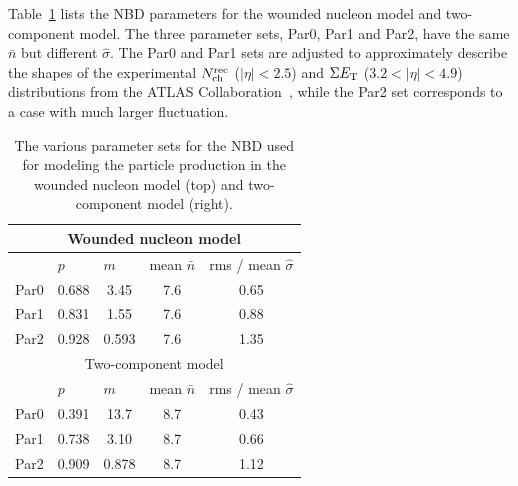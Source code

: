 Table~\ref{table:centfluc_Glauber_pars} lists the NBD parameters for the wounded nucleon model and two-component model. The three parameter sets, Par0, Par1 and Par2, have the same $\bar{n}$ but different $\hat{\sigma}$. The Par0 and Par1 sets are adjusted to approximately describe the shapes of the experimental $N_\text{ch}^\text{rec}$ ($|\eta|<2.5$) and $\Sigma E_\text{T}$ ($3.2<|\eta|<4.9$) distributions from the ATLAS Collaboration~\cite{ATLAS-CONF-2017-066}, while the Par2 set corresponds to a case with much larger fluctuation.

\begin{table}[H]
\centering
\begin{tabular}{|lcccc|}
\hline
\multicolumn{5}{|c|}{Wounded nucleon model}                                                                                                                                \\ \hline
                           & \multicolumn{1}{l}{$p$}    & \multicolumn{1}{l}{$m$}    & \multicolumn{1}{l}{mean $\bar{n}$} & \multicolumn{1}{l|}{rms / mean $\hat{\sigma}$} \\ \hline
\multicolumn{1}{|l|}{Par0} & \multicolumn{1}{c|}{0.688} & \multicolumn{1}{c|}{3.45}  & \multicolumn{1}{c|}{7.6}           & 0.65                                           \\ \hline
\multicolumn{1}{|l|}{Par1} & \multicolumn{1}{c|}{0.831} & \multicolumn{1}{c|}{1.55}  & \multicolumn{1}{c|}{7.6}           & 0.88                                           \\ \hline
\multicolumn{1}{|l|}{Par2} & \multicolumn{1}{c|}{0.928} & \multicolumn{1}{c|}{0.593} & \multicolumn{1}{c|}{7.6}           & 1.35                                           \\ \hline
\multicolumn{5}{|c|}{Two-component model}                                                                                                                                  \\ \hline
                           & \multicolumn{1}{l}{$p$}    & \multicolumn{1}{l}{$m$}    & \multicolumn{1}{l}{mean $\bar{n}$} & \multicolumn{1}{l|}{rms / mean $\hat{\sigma}$} \\ \hline
\multicolumn{1}{|l|}{Par0} & \multicolumn{1}{c|}{0.391} & \multicolumn{1}{c|}{13.7}  & \multicolumn{1}{c|}{8.7}           & 0.43                                           \\ \hline
\multicolumn{1}{|l|}{Par1} & \multicolumn{1}{c|}{0.738} & \multicolumn{1}{c|}{3.10}  & \multicolumn{1}{c|}{8.7}           & 0.66                                           \\ \hline
\multicolumn{1}{|l|}{Par2} & \multicolumn{1}{c|}{0.909} & \multicolumn{1}{c|}{0.878} & \multicolumn{1}{c|}{8.7}           & 1.12                                           \\ \hline
\end{tabular}
\caption{The various parameter sets for the NBD used for modeling the particle production in the wounded nucleon model (top) and two-component model (right).}
\label{table:centfluc_Glauber_pars}
\end{table}

